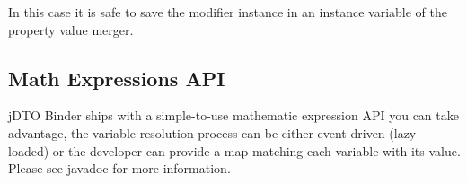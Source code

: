 \documentclass[11pt]{article}
\newcommand{\JDTO}{jDTO Binder\xspace}
\begin{document}
In this case it is safe to save the modifier instance in an instance variable of the property value merger.

\subsection{Math Expressions API}

\JDTO ships with a simple-to-use mathematic expression API you can take advantage, the variable resolution process can be either event-driven (lazy loaded) or the developer can provide a map matching each variable with its value. Please see javadoc for more information.
\end{document}
